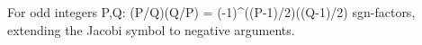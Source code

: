 For odd integers P,Q: (P/Q)(Q/P) = (-1)^{((P-1)/2)((Q-1)/2)} sgn-factors, extending the Jacobi symbol to negative arguments.
